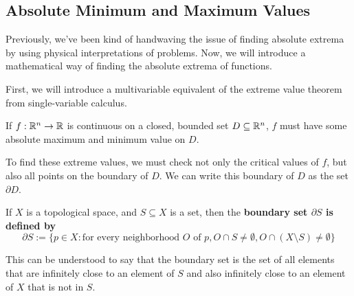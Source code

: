 \subsection{Absolute Minimum and Maximum Values}
Previously, we've been kind of handwaving the issue of finding absolute extrema by using physical interpretations of problems. Now, we will introduce a mathematical way of finding the absolute extrema of functions.\par
First, we will introduce a multivariable equivalent of the extreme value theorem from single-variable calculus.
\begin{theorem}
    If \(f:\mathbb{R}^n\to \mathbb{R}\) is continuous on a closed, bounded set \(D\subseteq \mathbb{R}^n\), \(f\) must have some absolute maximum and minimum value on \(D\). 
\end{theorem}
To find these extreme values, we must check not only the critical values of \(f\), but also all points on the boundary of \(D\). We can write this boundary of \(D\) as the set \(\partial D\).
\begin{definition}
    If \(X\) is a topological space, and \(S\subseteq X\) is a set, then the \bf{boundary set} \(\partial S\) is defined by
    \[ \partial S := \{p\in X: \text{for every neighborhood \(O\) of \(p\)}, O\cap S\neq \emptyset, O\cap(X\setminus S)\neq \emptyset\} \]
\end{definition}
This can be understood to say that the boundary set is the set of all elements that are infinitely close to an element of \(S\) and also infinitely close to an element of \(X\) that is not in \(S\). \par
